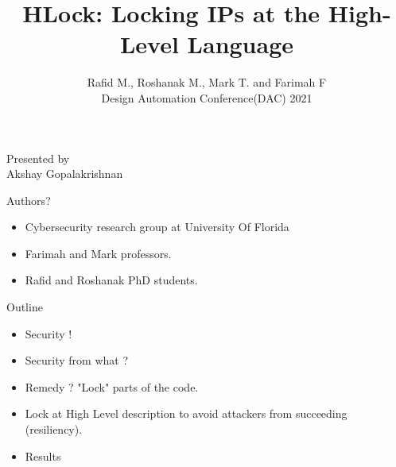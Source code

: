 \documentclass[xcolor=dvipsnames]{beamer}
\title{HLock: Locking IPs at the High-Level Language}
\subtitle{Rafid M., Roshanak M., Mark T. and Farimah F \\ Design Automation Conference(DAC) 2021}
\begin{document}
    
    \begin{frame}

        \maketitle

        Presented by \\ Akshay Gopalakrishnan

    \end{frame}

    \begin{frame}{Authors?}

        \begin{itemize}
            \item Cybersecurity research group at University Of Florida
            \item Farimah and Mark professors.
            \item Rafid and Roshanak PhD students.   
        \end{itemize}
        
    \end{frame}

    \begin{frame}{Outline}

        \begin{itemize}
            \item Security ! 
            \item Security from what ? 
            \item Remedy ? "Lock" parts of the code. 
            \item Lock at High Level description to avoid attackers from succeeding (resiliency).
            \item Results
        \end{itemize}
        
    \end{frame}
\end{document}
